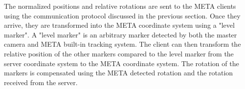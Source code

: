            The normalized positions and relative rotations are sent to the META
            clients using the communication protocol discussed in the previous
            section. Once they arrive, they are transformed into the META
            coordinate system using a "level marker". A "level marker" is an
            arbitrary marker detected by both the master camera and META
            built-in tracking system. The client can then transform the relative
            position of the other markers compared to the level marker from the
            server coordinate system to the META coordinate system. The rotation
            of the markers is compensated using the META detected rotation and
            the rotation received from the server.